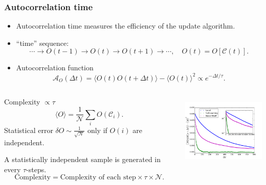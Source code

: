 \documentclass[xcolor=table, 10pt, aspectratio=169, ignorenonframetext]{beamer}
\begin{document}
\begin{frame}
  \frametitle{Autocorrelation time}
  \begin{itemize}
    \item Autocorrelation time measures the efficiency of the update algorithm.
    \item ``time'' sequence:
    \[\cdots\rightarrow O(t-1)\rightarrow O(t)\rightarrow O(t+1)\rightarrow\cdots,
  \quad O(t) = O[\mathcal C(t)].\]
    \item Autocorrelation function
    \[\mathcal A_O(\Delta t)=\langle O(t)O(t+\Delta t)\rangle - \langle O(t)\rangle^2\propto e^{-\Delta t/\tau}.\]
  \end{itemize}
  \begin{columns}
    \begin{block}{Complexity $\propto \tau$}
      \[\langle O\rangle = \frac1{\mathcal N}\sum_iO(\mathcal C_i).\]
      Statistical error $\delta O\sim\frac1{\sqrt{\mathcal N}}$ only if $O(i)$ are independent.

A statistically independent sample is generated in every $\tau$-steps.
\[\text{Complexity}=\text{Complexity of each step}\times\tau\times\mathcal N.\]
    \end{block}
    \centering
    \includegraphics[height=3.5cm]{../slmctut/auto_decay}
  \end{columns}
\end{frame}
\end{document}
